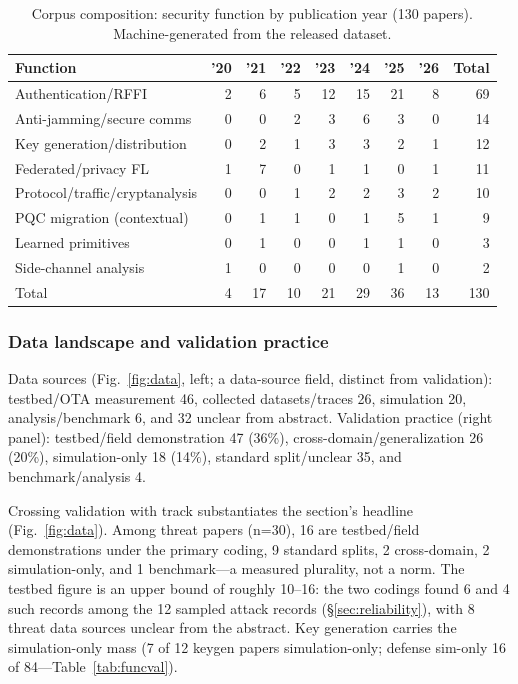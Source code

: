 \begin{table}[tbp]
\centering
\caption{Corpus composition: security function by publication year (130 papers). Machine-generated from the released dataset.}
\label{tab:functions}
\begin{tabular}{lrrrrrrrr}
\toprule
Function & '20 & '21 & '22 & '23 & '24 & '25 & '26 & Total \\
\midrule
Authentication/RFFI & 2 & 6 & 5 & 12 & 15 & 21 & 8 & 69 \\
Anti-jamming/secure comms & 0 & 0 & 2 & 3 & 6 & 3 & 0 & 14 \\
Key generation/distribution & 0 & 2 & 1 & 3 & 3 & 2 & 1 & 12 \\
Federated/privacy FL & 1 & 7 & 0 & 1 & 1 & 0 & 1 & 11 \\
Protocol/traffic/cryptanalysis & 0 & 0 & 1 & 2 & 2 & 3 & 2 & 10 \\
PQC migration (contextual) & 0 & 1 & 1 & 0 & 1 & 5 & 1 & 9 \\
Learned primitives & 0 & 1 & 0 & 0 & 1 & 1 & 0 & 3 \\
Side-channel analysis & 1 & 0 & 0 & 0 & 0 & 1 & 0 & 2 \\
Total & 4 & 17 & 10 & 21 & 29 & 36 & 13 & 130 \\
\bottomrule
\end{tabular}
\end{table}

\subsubsection{Data landscape and validation practice}
Data sources (Fig.~\ref{fig:data}, left; a data-source field, distinct from validation): testbed/OTA measurement 46, collected datasets/traces 26, simulation 20, analysis/benchmark 6, and 32 unclear from abstract. Validation practice (right panel): testbed/field demonstration 47 (36\%), cross-domain/generalization 26 (20\%), simulation-only 18 (14\%), standard split/unclear 35, and benchmark/analysis 4.

Crossing validation with track substantiates the section's headline (Fig.~\ref{fig:data}). Among threat papers (n=30), 16 are testbed/field demonstrations under the primary coding, 9 standard splits, 2 cross-domain, 2 simulation-only, and 1 benchmark---a measured plurality, not a norm. The testbed figure is an upper bound of roughly 10--16: the two codings found 6 and 4 such records among the 12 sampled attack records (\S\ref{sec:reliability}), with 8 threat data sources unclear from the abstract. Key generation carries the simulation-only mass (7 of 12 keygen papers simulation-only; defense sim-only 16 of 84---Table~\ref{tab:funcval}).

